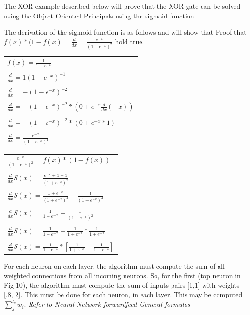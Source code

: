 \documentclass[journal]{IEEEtran}
\begin{document}
The XOR example described below will prove that the XOR gate can be solved using the Object Oriented Principals using the sigmoid function.

\hfill\break
The derivation of the sigmoid function is as follows and will show that Proof that $f(x) * (1 - f(x) = \frac{d}{dx} = \frac {e^{-x}}{(1 - e^{-x})^{2}}$
hold true.

\hfill\break
\begin{tabular}{ l }
     $f(x) = \frac{1}{1 - e^{-x}}$ \tabularnewline \\ 
     $\frac{d}{dx} = 1(1 - e^{-x})^{-1}$ \tabularnewline \\  
     $\frac{d}{dx} = -(1 - e^{-x})^{-2}$ \tabularnewline \\
     $\frac{d}{dx} = -(1 - e^{-x})^{-2} * (0 + e^{-x}\frac{d}{dx}(-x))$ \tabularnewline \\
     $\frac{d}{dx} = -(1 - e^{-x})^{-2} * (0 + e^{-x} * 1)$ \tabularnewline \\
     $\frac{d}{dx} = \frac {e^{-x}}{(1 - e^{-x})^{2}}$
\end{tabular}

\hfill\break
\begin{tabular}{ l }
    $\frac {e^{-x}}{(1 - e^{-x})^{2}} = f(x) * (1 - f(x))$ \tabularnewline \\ 
    $\frac{d}{dx}S(x) = \frac{e^{-x} + 1 - 1}{(1 + e^{-x})^{2}}$ \tabularnewline \\ 
    $\frac{d}{dx}S(x) = \frac{1 + e^{-x}}{(1 + e^{-x})^{2}} - \frac{1}{(1 - e^{-x})^{2}}$ \tabularnewline \\
    $\frac{d}{dx}S(x) = \frac{1}{1 + e^{-x}} - \frac{1}{(1 + e^{-x})^{2}}$ \tabularnewline \\
    $\frac{d}{dx}S(x) = \frac{1}{1 + e^{-x}} - \frac{1}{1 + e^{-x}} * \frac{1}{1 + e^{-x}}$ \tabularnewline \\
    $\frac{d}{dx}S(x) = \frac{1}{1 + e^{-x}} * [\frac{1}{1 + e^{-x}} - \frac{1}{1 + e^{-x}}]$
\end{tabular}
    
\break
\break
\break
For each neuron on each layer, the algorithm must compute the sum of all weighted connections from all incoming neurons.  So, for the first (top neuron in Fig 10), the algorithm must compute the sum of inputs pairs [1,1] with weights [.8, 2].  This must be done for each neuron, in each layer.  This may be computed $\sum_{j}^{l_k} w_{i}$.  \textit{Refer to Neural Network forwardfeed General formulas}
\end{document}
